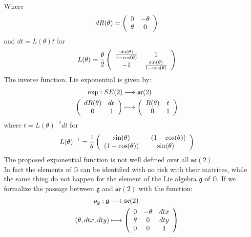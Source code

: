 Where 
\begin{align*}
dR(\theta) = 
\left (
\begin{array} {c c }
 0 & -\theta \\
\theta & 0 
\end{array}
\right )
\end{align*}
and $dt = L(\theta)t$ for 
\begin{align*}
L(\theta) = 
\frac{\theta}{2}
\left (
\begin{array} {c c }
\frac{\sin(\theta)}{1-\cos(\theta)} & 1 \\
-1 & \frac{\sin(\theta)}{1-\cos(\theta)}
\end{array}
\right )
\end{align*}
The inverse function, Lie exponential is given by:
\begin{align*}
\exp : SE(2) & \longrightarrow \mathfrak{se}(2) 
\\
\left (
\begin{array} {c c }
dR(\theta) & dt \\
0 & 1 
\end{array}
\right )
&\longmapsto  
\left (
\begin{array} {c c }
R(\theta) & t \\
0 & 1 
\end{array}
\right )
\end{align*}
 where $t = L(\theta)^{-1}dt$ for 
 \begin{align*}
 L(\theta)^{-1} = 
 \frac{1}{\theta}
 \left (
 \begin{array} {c c }
 \sin(\theta) & -(1-\cos(\theta)) \\
 (1-\cos(\theta)) & \sin(\theta)
 \end{array}
 \right )
 \end{align*}
The proposed exponential function is not well defined over all $\mathfrak{se}(2)$.\\
In fact the elements of $\mathbb{G}$ can be identified with no risk with their matrices, while the same thing do not happen for the element of the Lie algebra $\mathfrak{g}$ of $\mathbb{G}$. 
If we formalize the passage between $\mathfrak{g} $ and $\mathfrak{se}(2)$ with the function:
\begin{align*}
\rho_{\mathfrak{g}} : \mathfrak{g} &\longrightarrow  \mathfrak{se}(2)\\
(\theta, dtx, dty) 
& \longmapsto
\left (
\begin{array} {c c c }
0 & -\theta & dtx \\
\theta & 0 & dty\\
0 & 0 &  1
\end{array}
\right )
\end{align*}
